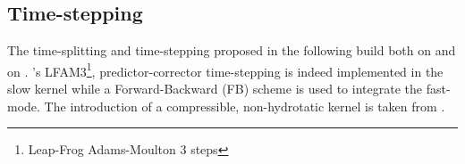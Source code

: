 \subsection{Time-stepping}
The time-splitting and time-stepping proposed in the following build both on \cite{shchepetkin_regional_2005} and on \cite{auclair_non-hydrostatic_2018}.   \cite{shchepetkin_regional_2005}'s LFAM3\footnote{Leap-Frog Adams-Moulton 3 steps}, predictor-corrector time-stepping is indeed implemented in the slow kernel while a Forward-Backward (FB) scheme is used to integrate the fast-mode. The introduction of a compressible, non-hydrotatic kernel is taken from \cite{auclair_non-hydrostatic_2018}.

